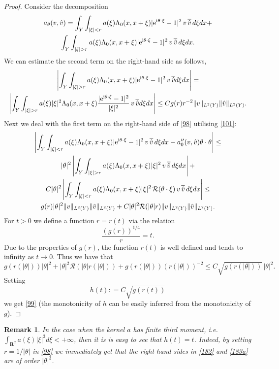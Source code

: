 \documentclass[11pt]{article}
\def\rme{{\rm e}}
\def\rmi{{\rm i}}
\newcommand{\R}{\mathbf{R}}
\newtheorem{remark}[theorem]{Remark}
\theoremstyle{remark}
\begin{document}
\begin{proof}
Consider the decomposition
\begin{multline}\label{98}
	a_\theta(v, \hat v)  =
	\int_{Y}\int_{|\xi|< r} a(\xi) \Lambda_0(x,x+\xi) |\rme^{\rmi \theta\cdot\xi} -1|^2 \,v\, \overline{\hat v}\,d\xi dx +
	\\
	\int_{Y}\int_{|\xi|>r} a(\xi) \Lambda_0(x,x+\xi) |\rme^{\rmi \theta\cdot\xi} -1|^2 \,v\, \overline{\hat v}\,d\xi dx.
\end{multline}
We can estimate the second term on the right-hand  side as follows,
\begin{multline}\label{182}
	\left|	\int_{Y}\int_{|\xi|>r} a(\xi) \Lambda_0(x,x+\xi) |\rme^{\rmi \theta\cdot\xi} -1|^2 \,v\, \overline{\hat v}d\xi dx \right| =
	\\
	\left|	\int_{Y}\int_{|\xi|>r} a(\xi)|\xi|^2 \Lambda_0(x,x+\xi) \frac{|\rme^{\rmi \theta\cdot\xi} -1|^2}{|\xi|^2} \,v\, \overline{\hat v}d\xi dx \right|\leq C g(r) r^{-2}  \|v\|_{L^2(Y)} \|\hat v\|_{L^2(Y)}.
\end{multline}
Next we deal with the first term on the right-hand  side of \eqref{98} utilising \eqref{101}:
\begin{multline}\label{183a}
	\left|\int_{Y}\int_{|\xi|< r} a(\xi) \Lambda_0(x,x+\xi) |\rme^{\rmi \theta\cdot\xi} -1|^2 \,v\, \overline{\hat v}\,d\xi dx  - a_0'' (v, \hat v)\theta\cdot\theta\right| \leq
	\\
	|\theta|^2	\left|	\int_{Y}\int_{|\xi|> r} a(\xi) \Lambda_0(x,x+\xi) |\xi|^2 \,v\, \overline{\hat v}\,d\xi dx \right| +
	\\
	C |\theta|^2 \left| \int_{Y}\int_{|\xi|< r} a(\xi) \Lambda_0(x,x+\xi)  |\xi|^2 \, \mathcal R(\theta\cdot \xi) \,v\, \overline{\hat v}\,d\xi dx\right| \leq
	\\
	g(r) |\theta|^2 \|v\|_{L^2(Y)} \|\hat v\|_{L^2(Y)} + C |\theta|^2 \mathcal R(|\theta| r) \|v\|_{L^2(Y)} \|\hat v\|_{L^2(Y)}.
\end{multline}
For $t>0$ we define a function $r = r(t)$ via the relation
\begin{equation*}
	\frac{(g(r))^{1/4}}{r} = t.
\end{equation*}
Due to the properties of  $g(r)$,   the function $r(t)$ is well defined and tends to infinity as $t \to 0$. Thus we have that
\begin{equation*}
	g(r(|\theta|)) |\theta|^2 + |\theta|^2\mathcal R(|\theta|r(|\theta|)) + g(r(|\theta|)) (r(|\theta|))^{-2} \leq C \sqrt{g(r(|\theta|))} \, |\theta|^2.
\end{equation*}
Setting
\begin{equation}\label{189}
	h(t): =  C \sqrt{g(r(t))}
\end{equation}
we get \eqref{99}  (the monotonicity of $h$ can be easily inferred from the monotonicity of $g$).
\end{proof}
\begin{remark} \label{r6.6}
	In the case when the kernel $a$ has finite third moment, i.e.
	$\int_{\R^d} a(\xi)|\xi|^3 d\xi< +\infty$, then it is is easy to see that $h(t)=t$. Indeed, by setting $r=1/|\theta|$ in \eqref{98} we immediately get that the right hand sides in  \eqref{182} and \eqref{183a} are of order $|\theta|^3$.
\end{remark} 	
\end{document}
